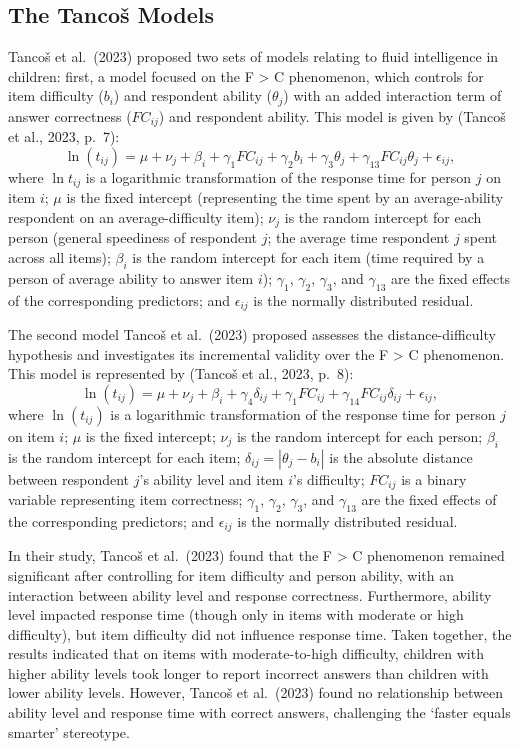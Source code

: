 \documentclass[
]{agujournal2019}
\begin{document}
\subsection{The Tancoš Models}\label{the-tancoux161-models}

Tancoš et al.~(2023) proposed two sets of models relating to fluid
intelligence in children: first, a model focused on the F \textgreater{}
C phenomenon, which controls for item difficulty (\(b_i\)) and
respondent ability (\(\theta_j\)) with an added interaction term of
answer correctness (\(FC_{ij}\)) and respondent ability. This model is
given by (Tancoš et al., 2023, p.~7):
\[\ln{(t_{ij})}=\mu+\nu_j+\beta_i+\gamma_1 FC_{ij}+\gamma_2 b_i+\gamma_3 \theta_j+\gamma_{13} FC_{ij}\theta_j+\epsilon_{ij},\]
where \(\ln{t_{ij}}\) is a logarithmic transformation of the response
time for person \(j\) on item \(i\); \(\mu\) is the fixed intercept
(representing the time spent by an average-ability respondent on an
average-difficulty item); \(\nu_j\) is the random intercept for each
person (general speediness of respondent \(j\); the average time
respondent \(j\) spent across all items); \(\beta_i\) is the random
intercept for each item (time required by a person of average ability to
answer item \(i\)); \(\gamma_1\), \(\gamma_2\), \(\gamma_3\), and
\(\gamma_{13}\) are the fixed effects of the corresponding predictors;
and \(\epsilon_{ij}\) is the normally distributed residual.

The second model Tancoš et al.~(2023) proposed assesses the
distance-difficulty hypothesis and investigates its incremental validity
over the F \textgreater{} C phenomenon. This model is represented by
(Tancoš et al., 2023, p.~8):
\[\ln{(t_{ij})}=\mu+\nu_j+\beta_i+\gamma_4 \delta_{ij}+\gamma_1 FC_{ij}+\gamma_14 FC_{ij} \delta_{ij}+\epsilon_{ij},\]
where \(\ln{(t_{ij})}\) is a logarithmic transformation of the response
time for person \(j\) on item \(i\); \(\mu\) is the fixed intercept;
\(\nu_j\) is the random intercept for each person; \(\beta_i\) is the
random intercept for each item; \(\delta_{ij}=|\theta_j-b_i|\) is the
absolute distance between respondent \(j\)'s ability level and item
\(i\)'s difficulty; \(FC_{ij}\) is a binary variable representing item
correctness; \(\gamma_1\), \(\gamma_2\), \(\gamma_3\), and
\(\gamma_{13}\) are the fixed effects of the corresponding predictors;
and \(\epsilon_{ij}\) is the normally distributed residual.

In their study, Tancoš et al.~(2023) found that the F \textgreater{} C
phenomenon remained significant after controlling for item difficulty
and person ability, with an interaction between ability level and
response correctness. Furthermore, ability level impacted response time
(though only in items with moderate or high difficulty), but item
difficulty did not influence response time. Taken together, the results
indicated that on items with moderate-to-high difficulty, children with
higher ability levels took longer to report incorrect answers than
children with lower ability levels. However, Tancoš et al.~(2023) found
no relationship between ability level and response time with correct
answers, challenging the `faster equals smarter' stereotype.
\end{document}
